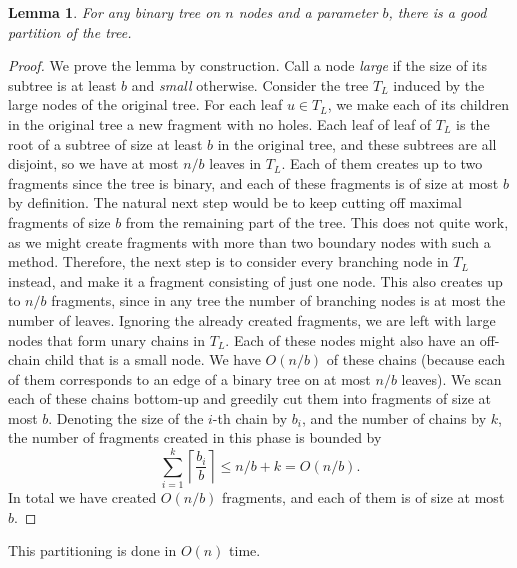 \documentclass[11pt,a4paper]{article}
\newtheorem{lemma}{Lemma}
\theoremstyle{definition}
\theoremstyle{remark}
\begin{document}
\begin{lemma}\label{basic partitioning lemma}
For any binary tree on $n$ nodes and a parameter $b$, there is a good partition of the tree.
\end{lemma}
\begin{proof}
We prove the lemma by construction. Call a node \textit{large} if the size of its subtree is at least $b$
and \textit{small} otherwise. Consider the tree $T_L$ induced by the large nodes of the original tree. 
For each leaf $u\in T_{L}$, we make each of its children in the original tree a new fragment with no holes.
Each leaf of leaf of $T_{L}$ is the root of a subtree of size at least $b$ in the original tree, and these subtrees
are all disjoint, so we have at most $n/b$ leaves in $T_{L}$. Each of them creates up to two fragments
since the tree is binary, and each of these fragments is of size at most $b$ by definition.
The natural next step would be to keep cutting off maximal fragments of size $b$ from the remaining
part of the tree. This does not quite work, as we might create fragments with more than two boundary
nodes with such a method.
Therefore, the next step is to consider every branching node in $T_{L}$ instead, and make it a fragment
consisting of just one node. This also creates up to $n/b$ fragments, since in any tree the number of
branching nodes is at most the number of leaves.
Ignoring the already created fragments, we are left with large nodes that form unary chains in $T_{L}$.
Each of these nodes might also have an off-chain child that is a small node. We have $O(n/b)$ of these chains
(because each of them corresponds to an edge of a binary tree on at most $n/b$ leaves).
We scan each of these chains bottom-up and greedily cut them into fragments of size at most $b$.
Denoting the size of the $i$-th chain by $b_{i}$, and the number of chains by $k$, the number of fragments created in this phase is
bounded by $$\sum_{i=1}^{k} \left\lceil \frac{b_i}{b} \right\rceil \leq n/b+k=O(n/b).$$
In total we have created $O(n/b)$ fragments, and each of them is of size at most $b$.
\end{proof}
This partitioning is done in $O(n)$ time.
\end{document}
